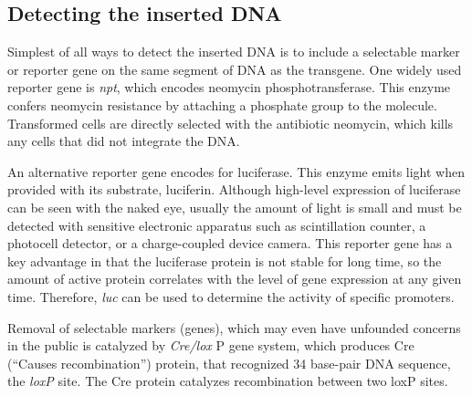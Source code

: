 \documentclass[nofonts,]{tufte-handout}
\begin{document}
\hypertarget{detecting-the-inserted-dna}{%
\subsection{Detecting the inserted
DNA}\label{detecting-the-inserted-dna}}

Simplest of all ways to detect the inserted DNA is to include a
selectable marker or reporter gene on the same segment of DNA as the
transgene. One widely used reporter gene is \emph{npt}, which encodes
neomycin phosphotransferase. This enzyme confers neomycin resistance by
attaching a phosphate group to the molecule. Transformed cells are
directly selected with the antibiotic neomycin, which kills any cells
that did not integrate the DNA.

An alternative reporter gene encodes for luciferase. This enzyme emits
light when provided with its substrate, luciferin. Although high-level
expression of luciferase can be seen with the naked eye, usually the
amount of light is small and must be detected with sensitive electronic
apparatus such as scintillation counter, a photocell detector, or a
charge-coupled device camera. This reporter gene has a key advantage in
that the luciferase protein is not stable for long time, so the amount
of active protein correlates with the level of gene expression at any
given time. Therefore, \emph{luc} can be used to determine the activity
of specific promoters.

Removal of selectable markers (genes), which may even have unfounded
concerns in the public is catalyzed by \emph{Cre/lox} P gene system,
which produces Cre (``Causes recombination'') protein, that recognized
34 base-pair DNA sequence, the \emph{\emph{loxP}} site. The Cre protein
catalyzes recombination between two loxP sites.
\end{document}
